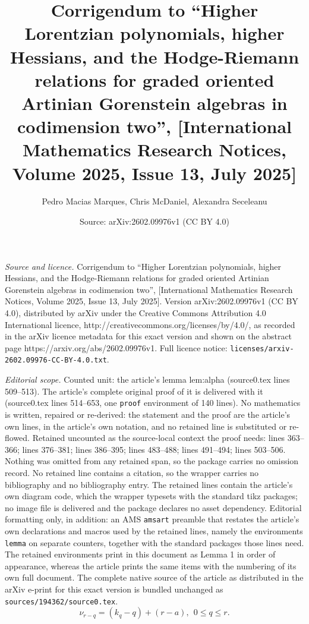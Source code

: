 \documentclass[10pt,a4paper]{amsart}
\title{Corrigendum to ``Higher Lorentzian polynomials, higher Hessians, and the Hodge-Riemann relations for graded oriented Artinian Gorenstein algebras in codimension two'', [International Mathematics Research Notices, Volume 2025, Issue 13, July 2025]}
\author{Pedro Macias Marques, Chris McDaniel, Alexandra Seceleanu}
\date{Source: arXiv:2602.09976v1 (CC BY 4.0)}
\begin{document}
\maketitle

\noindent\emph{Source and licence.} Corrigendum to ``Higher Lorentzian polynomials, higher Hessians, and the Hodge-Riemann relations for graded oriented Artinian Gorenstein algebras in codimension two'', [International Mathematics Research Notices, Volume 2025, Issue 13, July 2025]. Version arXiv:2602.09976v1 (CC BY 4.0), distributed by arXiv under the Creative Commons Attribution 4.0 International licence, http://creativecommons.org/licenses/by/4.0/, as recorded in the arXiv licence metadata for this exact version and shown on the abstract page https://arxiv.org/abs/2602.09976v1. Full licence notice: \texttt{licenses/arxiv-2602.09976-CC-BY-4.0.txt}.\par\smallskip

\noindent\textit{Editorial scope.} Counted unit: the article's lemma lem:alpha (source0.tex lines 509--513). The article's complete original proof of it is delivered with it (source0.tex lines 514--653, one \texttt{proof} environment of 140 lines). No mathematics is written, repaired or re-derived: the statement and the proof are the article's own lines, in the article's own notation, and no retained line is substituted or re-flowed.  Retained uncounted as the source-local context the proof needs: lines 363--366; lines 376--381; lines 386--395; lines 483--488; lines 491--494; lines 503--506.  Nothing was omitted from any retained span, so the package carries no omission record.  No retained line contains a citation, so the wrapper carries no bibliography and no bibliography entry.  The retained lines contain the article's own diagram code, which the wrapper typesets with the standard tikz packages; no image file is delivered and the package declares no asset dependency.  Editorial formatting only, in addition: an AMS \texttt{amsart} preamble that restates the article's own declarations and macros used by the retained lines, namely the environments \texttt{lemma} on separate counters, together with the standard packages those lines need.  The retained environments print in this document as Lemma 1 in order of appearance, whereas the article prints the same items with the numbering of its own full document.  The complete native source of the article as distributed in the arXiv e-print for this exact version is bundled unchanged as \texttt{sources/194362/source0.tex}.
\begin{equation}
	\label{eq:nu}
	\nu_{r-q}=(k_q-q)+(r-a), \ \ 0\leq q\leq r.
\end{equation}
\end{document}
